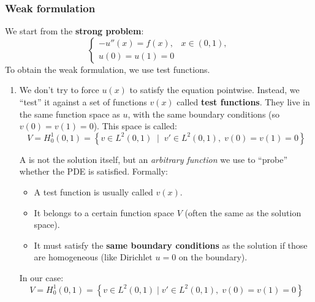 \subsubsection{Weak formulation}

We start from the \textbf{strong problem}:
\begin{equation*}
    \begin{cases}
        - u''(x) = f(x), & x \in (0,1), \\[.5em]
        u(0)=u(1)=0 &
    \end{cases}
\end{equation*}
To obtain the weak formulation, we use test functions.
\begin{enumerate}
    \item {} We don't try to force $u(x)$ to satisfy the equation pointwise. Instead, we ``test'' it against a set of functions $v(x)$ called \textbf{test functions}. They live in the same function space as $u$, with the same boundary conditions (so $v(0)=v(1)=0$). This space is called:
    \begin{equation}
        V = H^1_0(0,1) = \left\{ v \in L^2(0,1) \;\;|\;\; v' \in L^2(0,1),\; v(0)=v(1)=0 \right\}
    \end{equation}

    \begin{deepeningbox}
        A  is not the solution itself, but an \emph{arbitrary function} we use to ``probe'' whether the PDE is satisfied. Formally:
        \begin{itemize}
            \item A test function is usually called $v(x)$.
            \item It belongs to a certain function space $V$ (often the same as the solution space).
            \item It must satisfy the \textbf{same boundary conditions} as the solution if those are homogeneous (like Dirichlet $u=0$ on the boundary).
        \end{itemize}
        In our case:
        \begin{equation*}
            V = H^1_0(0,1) = \left\{ v \in L^2(0,1) \mid v' \in L^2(0,1),\; v(0)=v(1)=0 \right\}
        \end{equation*}


\end{deepeningbox}
\end{enumerate}
